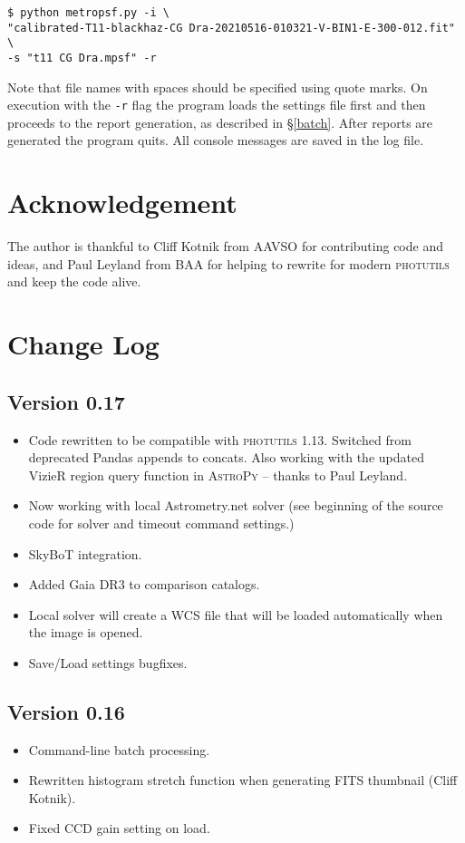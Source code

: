 \documentclass{article}
\begin{document}
\begin{verbatim}
$ python metropsf.py -i \
"calibrated-T11-blackhaz-CG Dra-20210516-010321-V-BIN1-E-300-012.fit" \
-s "t11 CG Dra.mpsf" -r
\end{verbatim}

Note that file names with spaces should be specified using quote marks. On execution with the \texttt{-r} flag the program loads the settings file first and then proceeds to the report generation, as described in \S \ref{batch}. After reports are generated the program quits. All console messages are saved in the log file.

\section {Acknowledgement} 
The author is thankful to Cliff Kotnik from AAVSO for contributing code and ideas, and Paul Leyland from BAA for helping to rewrite for modern \textsc{photutils} and keep the code alive.

\section{Change Log}

\subsection{Version 0.17}
\begin{itemize}
 	\item Code rewritten to be compatible with \textsc{photutils 1.13}. Switched from deprecated Pandas appends to concats. Also working with the updated VizieR region query function in \textsc{AstroPy} -- thanks to Paul Leyland.
	\item Now working with local Astrometry.net solver (see beginning of the source code for solver and timeout command settings.)
	\item SkyBoT integration. 
	\item Added Gaia DR3 to comparison catalogs.
	\item Local solver will create a WCS file that will be loaded automatically when the image is opened.
	\item Save/Load settings bugfixes.
\end{itemize}

\subsection{Version 0.16}
\begin{itemize}
\item Command-line batch processing.
\item Rewritten histogram stretch function when generating FITS thumbnail (Cliff Kotnik).
\item Fixed CCD gain setting on load.
\end{itemize}
\end{document}
